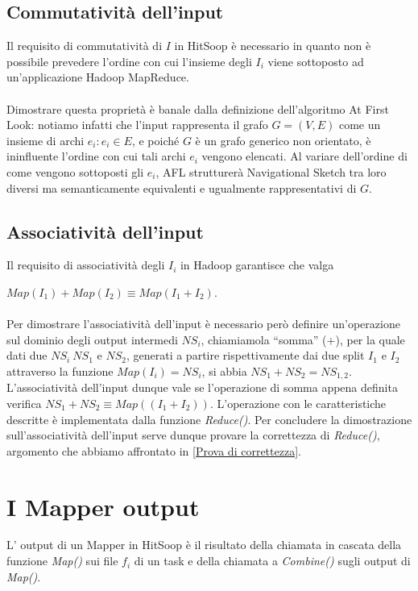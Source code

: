 \documentclass[a4paper,11pt]{report}
\begin{document}
\subsection{Commutatività dell'input}
Il requisito di commutatività di $I$ in HitSoop è necessario in quanto non è possibile prevedere l'ordine con cui l'insieme degli $I_i$
viene sottoposto ad un'applicazione Hadoop MapReduce.
\paragraph{}
Dimostrare questa proprietà è banale dalla definizione dell'algoritmo At First Look: notiamo infatti che l'input rappresenta il grafo
$G=\left(V,E\right)$ come un insieme di archi $e_i:e_i\in E$, e poiché
$G$ è un grafo generico non orientato, è ininfluente l'ordine con cui tali archi $e_i$ vengono elencati. Al variare dell'ordine di come
vengono sottoposti gli $e_i$, AFL strutturerà Navigational Sketch 
tra loro diversi ma semanticamente equivalenti e ugualmente rappresentativi di $G$.

\subsection{Associatività dell'input}\label{Associativita dell'input}
Il requisito di associatività degli $I_i$ in Hadoop garantisce che valga\\
\begin{center}
 $Map\left(I_1\right)+Map\left(I_2\right)\equiv Map\left(I_1+I_2\right)$.
\end{center}
\paragraph{}
Per dimostrare l'associatività dell'input è necessario però definire un'operazione sul dominio degli output intermedi $NS_i$, chiamiamola
``somma'' ($+$), per la quale dati due $NS_i \ NS_1$ e $NS_2$, 
generati a partire rispettivamente dai due split $I_1$ e $I_2$ attraverso la funzione $Map(I_i)=NS_i$,  si abbia
\mbox{$NS_1+NS_2=NS_{1,2}$}. 
L'associatività dell'input dunque vale se l'operazione di somma appena definita verifica \mbox{$NS_1+NS_2\equiv Map\left((I_1+I_2)\right)$}.
L'operazione con le caratteristiche descritte è implementata dalla funzione \emph{Reduce()}. 
Per concludere la dimostrazione sull'associatività dell'input serve dunque provare la correttezza di \emph{Reduce()}, argomento che abbiamo
affrontato in \ref{Prova di correttezza}.

\section{I Mapper output}
L' output di un Mapper in HitSoop è il risultato della chiamata in cascata della funzione \emph{Map()} sui file $f_i$ di un task e della
chiamata a \emph{Combine()} sugli output di \emph{Map()}.
\end{document}
